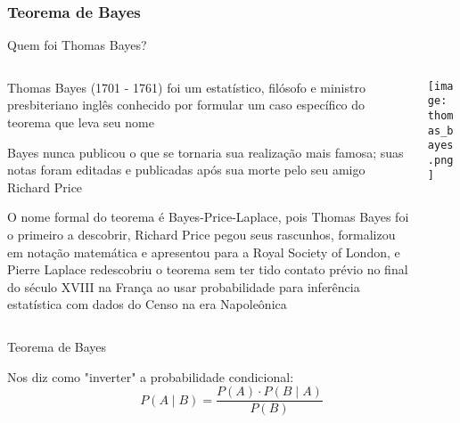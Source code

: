 \subsubsection{Teorema de Bayes}
\begin{frame}{Quem foi Thomas Bayes?}
    \begin{columns}
        \begin{column}{0.8\textwidth}
            \begin{vfilleditems}
                \item \small Thomas Bayes (1701 - 1761) foi um estatístico, filósofo
                e ministro presbiteriano inglês conhecido por formular um caso
                específico do teorema que leva seu nome
                \item \small Bayes nunca publicou o que se tornaria sua realização mais famosa;
                suas notas foram editadas e publicadas após sua morte pelo seu amigo
                Richard Price
                \item \small O nome formal do teorema é Bayes-Price-Laplace, pois Thomas
                Bayes foi o primeiro a descobrir, Richard Price pegou seus rascunhos,
                formalizou em notação matemática e apresentou para a Royal Society of London,
                e Pierre Laplace redescobriu o teorema sem ter tido contato prévio no final
                do século XVIII na França ao usar probabilidade para inferência estatística
                com dados do Censo na era Napoleônica
            \end{vfilleditems}
        \end{column}
        \begin{column}{0.2\textwidth}
            \centering
            \texttt{[image: thomas\_bayes.png]}
        \end{column}
    \end{columns}
\end{frame}


\begin{frame}{Teorema de Bayes}
    \begin{theo}[Bayes]
        Nos diz como "inverter" a probabilidade condicional: \newline \newline
        $$P(A \mid B) = \frac{P(A) \cdot P(B \mid A)}{P(B)}$$
    \end{theo}
\end{frame}

